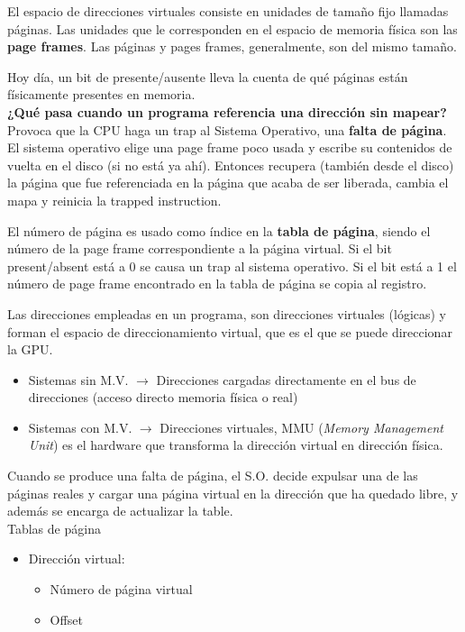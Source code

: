 \documentclass[10pt,portrait, twocolumn]{article}
\begin{document}
	\quad El espacio de direcciones virtuales consiste en unidades de tamaño fijo llamadas páginas. Las unidades que le corresponden en el espacio de memoria física son las \textbf{page frames}. Las páginas y pages frames, generalmente, son del mismo tamaño.
	
	\quad Hoy día, un bit de presente/ausente lleva la cuenta de qué páginas están físicamente presentes en memoria.\\
	
	
\textbf{¿Qué pasa cuando un programa referencia una dirección sin mapear?} Provoca que la CPU haga un trap al Sistema Operativo, una \textbf{falta de página}. El sistema operativo elige una page frame poco usada y escribe su contenidos de vuelta en el disco (si no está ya ahí). Entonces recupera (también desde el disco) la página que fue referenciada en la página que acaba de ser liberada, cambia el mapa y reinicia la trapped instruction.

	\quad El número de página es usado como índice en la \textbf{tabla de página}, siendo el número de la page frame correspondiente a la página virtual. Si el bit present/absent está a 0 se causa un trap al sistema operativo. Si el bit está a 1 el número de page frame encontrado en la tabla de página se copia al registro.


Las direcciones empleadas en un programa, son direcciones virtuales (lógicas) y forman el espacio de direccionamiento virtual, que es el que se puede direccionar la GPU.

	\begin{itemize}
	\item Sistemas sin M.V. $\rightarrow$ Direcciones cargadas directamente en el bus de direcciones (acceso directo memoria física o real)
	\item Sistemas con M.V. $\rightarrow$ Direcciones virtuales, MMU (\textit{Memory Management Unit}) es el hardware que transforma la dirección virtual en dirección física.
	\end{itemize}

Cuando se produce una falta de página, el S.O. decide expulsar una de las páginas reales y cargar una página virtual en la dirección que ha quedado libre, y además se encarga de actualizar la table.\\

Tablas de página

	\begin{itemize}
	\item Dirección virtual:
		\begin{itemize}
		\item Número de página virtual
		\item Offset
		\end{itemize}
	\end{itemize}
\end{document}
